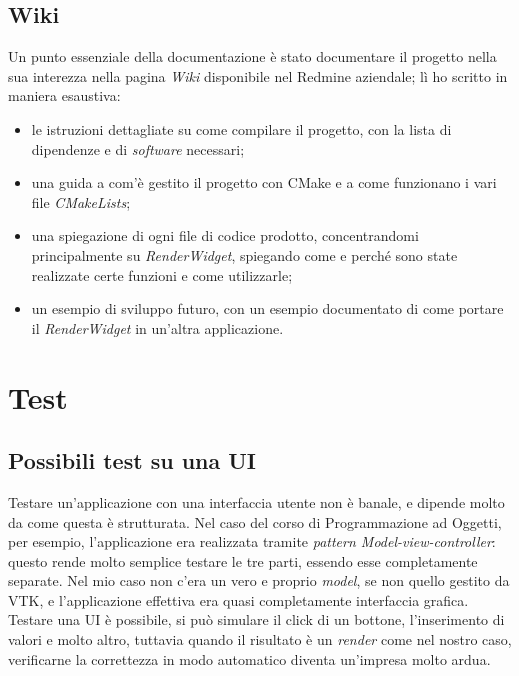 \subsection{Wiki}
Un punto essenziale della documentazione è stato documentare il progetto nella sua interezza nella pagina \emph{Wiki} disponibile nel Redmine aziendale; lì ho scritto in maniera esaustiva:
\begin{itemize}
\item le istruzioni dettagliate su come compilare il progetto, con la lista di dipendenze e di \emph{software} necessari;
\item una guida a com'è gestito il progetto con CMake e a come funzionano i vari file \emph{CMakeLists};
\item una spiegazione di ogni file di codice prodotto, concentrandomi principalmente su \emph{RenderWidget}, spiegando come e perché sono state realizzate certe funzioni e come utilizzarle;
\item un esempio di sviluppo futuro, con un esempio documentato di come portare il \emph{RenderWidget} in un'altra applicazione.
\end{itemize}

\section{Test}\label{sec:test-begin}
\subsection{Possibili test su una UI}
Testare un'applicazione con una interfaccia utente non è banale, e dipende molto da come questa è strutturata. Nel caso del corso di Programmazione ad Oggetti, per esempio, l'applicazione era realizzata tramite \emph{pattern Model-view-controller}: questo rende molto semplice testare le tre parti, essendo esse completamente separate. Nel mio caso non c'era un vero e proprio \emph{model}, se non quello gestito da VTK, e l'applicazione effettiva era quasi completamente interfaccia grafica. Testare una UI è possibile, si può simulare il click di un bottone, l'inserimento di valori e molto altro, tuttavia quando il risultato è un \emph{render} come nel nostro caso, verificarne la correttezza in modo automatico diventa un'impresa molto ardua.

